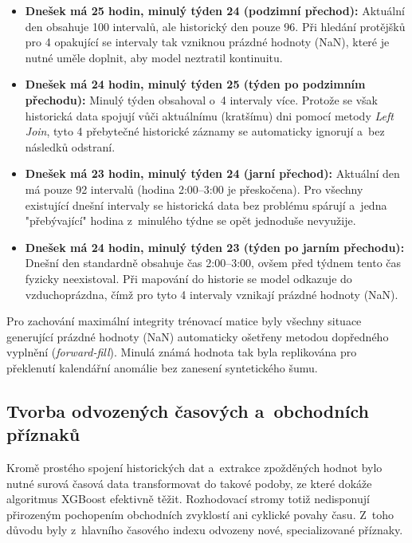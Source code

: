 \documentclass[a4paper]{article}
\begin{document}
\begin{itemize}
    \item \textbf{Dnešek má 25 hodin, minulý týden 24 (podzimní přechod):} 
    Aktuální den obsahuje 100 intervalů, ale historický den pouze 96. 
    Při hledání protějšků pro 4 opakující se intervaly tak vzniknou 
    prázdné hodnoty (NaN), které je nutné uměle doplnit, aby model neztratil 
    kontinuitu.
    
    \item \textbf{Dnešek má 24 hodin, minulý týden 25 (týden po podzimním přechodu):} 
    Minulý týden obsahoval o~4 intervaly více. Protože se však historická 
    data spojují vůči aktuálnímu (kratšímu) dni pomocí metody \textit{Left Join}, 
    tyto 4 přebytečné historické záznamy se automaticky ignorují a~bez 
    následků odstraní.
    
    \item \textbf{Dnešek má 23 hodin, minulý týden 24 (jarní přechod):} 
    Aktuální den má pouze 92 intervalů (hodina 2:00--3:00 je přeskočena). 
    Pro všechny existující dnešní intervaly se historická data bez problému 
    spárují a~jedna "přebývající" hodina z~minulého týdne se opět jednoduše nevyužije.
    
    \item \textbf{Dnešek má 24 hodin, minulý týden 23 (týden po jarním přechodu):} 
    Dnešní den standardně obsahuje čas 2:00--3:00, ovšem před týdnem 
    tento čas fyzicky neexistoval. Při mapování do historie se model 
    odkazuje do vzduchoprázdna, čímž pro tyto 4 intervaly vznikají 
    prázdné hodnoty (NaN).
\end{itemize}

Pro zachování maximální integrity trénovací matice byly všechny situace generující prázdné hodnoty (NaN) automaticky ošetřeny metodou dopředného vyplnění (\textit{forward-fill}). Minulá známá hodnota tak byla replikována pro překlenutí kalendářní anomálie bez zanesení syntetického šumu.

\subsection{Tvorba odvozených časových a~obchodních příznaků}
\label{subsec:odvozene-priznaky}
Kromě prostého spojení historických dat a~extrakce zpožděných hodnot bylo nutné surová časová data transformovat do takové podoby, ze které dokáže algoritmus XGBoost efektivně těžit. Rozhodovací stromy totiž nedisponují přirozeným pochopením obchodních zvyklostí ani cyklické povahy času. Z~toho důvodu byly z~hlavního časového indexu odvozeny nové, specializované příznaky.
\end{document}

